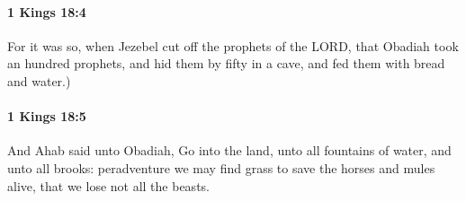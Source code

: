 		\paragraph{1 Kings 18:4} %
			\label{1KINGS-18-4}

			For it was so, when Jezebel cut off the prophets of the LORD, that Obadiah took an hundred prophets, and hid them by fifty in a cave, and fed them with bread and water.)


		\paragraph{1 Kings 18:5} %
			\label{1KINGS-18-5}

			And Ahab said unto Obadiah, Go into the land, unto all fountains of water, and unto all brooks: peradventure we may find grass to save the horses and mules alive, that we lose not all the beasts.


